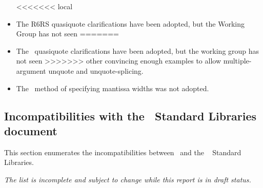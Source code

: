\begin{itemize}
<<<<<<< local
\item The R6RS {\cf quasiquote} clarifications have been adopted, but the Working Group has not seen
=======
\item The \rsixrs~{\cf quasiquote} clarifications have been adopted, but the working group has not seen
>>>>>>> other
convincing enough examples to allow multiple-argument {\cf unquote} and
{\cf unquote-splicing}.

\item The \rsixrs~method of specifying mantissa widths was not adopted.

\end{itemize}

\subsection*{Incompatibilities with the \rsixrs\ Standard Libraries document}

This section enumerates the incompatibilities between \rsevenrs\ and
the \rsixrs~\cite{R6RS} Standard Libraries.

{\em The list is incomplete and subject to change while this report is in draft status.}

